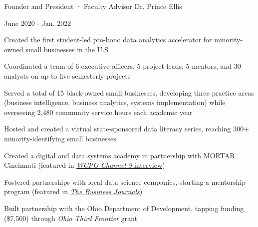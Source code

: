     \begin{minipage}{.75\linewidth} \begin{flushleft}
    		Founder and President · Faculty Advisor Dr. Prince Ellis
    	\end{flushleft} \end{minipage}
    \hfill 
    \begin{minipage}{.20\linewidth}\begin{flushright}
    	 June 2020 - Jan. 2022
    	\end{flushright}\end{minipage}
        \vspace{-5pt}
	\begin{description}[font=$\bullet$]
	    \item{Created the first student-led pro-bono data analytics accelerator for minority-owned small businesses in the U.S.}
        \vspace{-6pt}
        \item{Coordinated a team of 6 executive officers, 5 project leads, 5 mentors, and 30 analysts on up to five semesterly projects}
        \vspace{-6pt}
        \item{Served a total of 15 black-owned small businesses, developing three practice areas (business intelligence, business analytics, systems implementation) while overseeing 2,480 community service hours each academic year}
        \vspace{-6pt}
        \item{Hosted and created a virtual state-sponsored data literacy series, reaching 300+ minority-identifying small businesses}
        \vspace{-6pt}
        \item{Created a digital and data systems academy in partnership with MORTAR Cincinnati (featured in \href{https://www.youtube.com/watch?v=F1mG_0bLIBo&feature=youtu.be}{\textit{WCPO Channel 9} interview})}
        \vspace{-6pt}
        \item{Fostered partnerships with local data science companies, starting a mentorship program (featured in \href{https://www.bizjournals.com/cincinnati/inno/stories/news/2021/09/16/uc-student-founded-program-helps-companies-find.html}{\textit{The Business Journals}})}
        \vspace{-6pt}
        \item{Built partnership with the Ohio Department of Development, tapping funding (\$7,500) through \textit{Ohio Third Frontier} grant}
\end{description}


